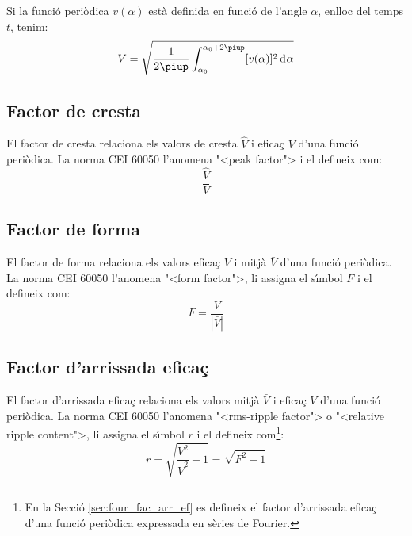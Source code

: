 Si la funci\'{o} peri\`{o}dica $v(\alpha)$ est\`{a} definida en funci\'{o} de
l'angle $\alpha$, enlloc del temps $t$, tenim:
\begin{equation}
    V = \sqrt{\frac{1}{2\piup} \int_{\alpha_0}^{\alpha_0+2\piup}
     [v(\alpha)]^2 \diff \alpha}
\end{equation}

\subsection{Factor de cresta}

El factor de cresta relaciona els valors de cresta $\hat{V}$
  i efica\c{c} $V$ d'una funci\'{o} peri\`{o}dica. La norma \textsf{CEI 60050} l'anomena {"<}peak factor{">} i el defineix com:
\begin{equation}
     \frac{\hat{V}}{V}
\end{equation}

\subsection{Factor de forma}

El factor de forma relaciona els valors efica\c{c} $V$
i mitj\`{a} $\bar{V}$ d'una funci\'{o} peri\`{o}dica. La norma \textsf{CEI 60050} l'anomena {"<}form factor{">}, li assigna el s\'{\i}mbol $F$ i el defineix com:
\begin{equation}
    F = \frac{V}{|\bar{V}|}
\end{equation}

\subsection{Factor d'arrissada efica\c{c}}

El factor d'arrissada efica\c{c} relaciona els
valors mitj\`{a} $\bar{V}$ i efica\c{c} $V$ d'una funci\'{o} peri\`{o}dica.
La norma \textsf{CEI 60050} l'anomena {"<}rms-ripple factor{">} o {"<}relative ripple content{">}, li assigna el s\'{\i}mbol $r$ i el defineix com\footnote{En la Secci\'{o} \ref{sec:four_fac_arr_ef} es defineix el factor d'arrissada efica\c{c} d'una funci\'{o} peri\`{o}dica expressada en s\`{e}ries de Fourier.}:
\begin{equation}
    r = \sqrt{\frac{V^2}{\bar{V}^2}-1} = \sqrt{F^2-1}\label{eq:rms_rip}
\end{equation}

